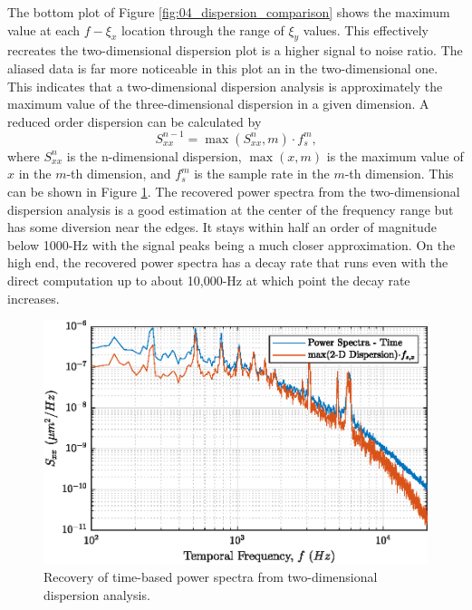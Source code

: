 The bottom plot of Figure \ref{fig:04_dispersion_comparison} shows the maximum value at each $f-\xi_x$ location through the range of $\xi_y$ values.
This effectively recreates the two-dimensional dispersion plot is a higher signal to noise ratio.
The aliased data is far more noticeable in this plot an in the two-dimensional one.
This indicates that a two-dimensional dispersion analysis is approximately the maximum value of the three-dimensional dispersion in a given dimension.
A reduced order dispersion can be calculated by
\begin{equation}
  S_{xx}^{n-1} = \max(S_{xx}^n,m)\cdot f_s^m \textrm{,}
\end{equation}
where $S_{xx}^n$ is the n-dimensional dispersion, $\max(x,m)$ is the maximum value of $x$ in the $m$-th dimension, and $f_s^m$ is the sample rate in the $m$-th dimension.
This can be shown in Figure \ref{fig:04_dispersion_max}.
The recovered power spectra from the two-dimensional dispersion analysis is a good estimation at the center of the frequency range but has some diversion near the edges.
It stays within half an order of magnitude below 1000-Hz with the signal peaks being a much closer approximation.
On the high end, the recovered power spectra has a decay rate that runs even with the direct computation up to about 10,000-Hz at which point the decay rate increases.
\begin{figure}
  \centering
  \includegraphics{../matlab/04_dispersion_analysis/dispersion_max.eps}
  \caption{Recovery of time-based power spectra from two-dimensional dispersion analysis.}
  \label{fig:04_dispersion_max}
\end{figure}

